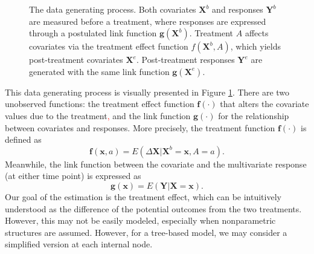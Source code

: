 \documentclass[smallextended]{svjour3}
\newcommand{\bg}[1]{\textcolor{red}{#1}}
\begin{document}
\begin{figure}[!h]
    \centering
    \caption{The data generating process. Both covariates $\bm X^b$ and responses $\bm Y^b$ are measured before a treatment, where responses are expressed through a postulated link function $\bm g(\bm X^b)$. Treatment $A$ affects covariates via the treatment effect function $f(\bm X^b, A)$, which yields post-treatment covariates $\bm X^e$. Post-treatment responses $\bm Y^e$ are generated with the same link function $\bm g(\bm X^e)$.}\label{fig1}
\end{figure}

This data generating process is visually presented in Figure \ref{fig1}. There are two unobserved functions: the treatment effect function $\bm f(\cdot)$ that alters the covariate values due to the treatment\bg{,} and the link function $\bm g(\cdot)$ for the relationship between covariates and responses. More precisely, the treatment function $\bm f(\cdot)$ is defined as 
$$\bm f(\bm x,a) = E(\Delta \bm X | \bm X^b=\bm x,A=a).$$
Meanwhile, the link function between the covariate and the multivariate response (at either time point) is expressed as 
$$\bm g(\bm x) = E(\bm Y |  \bm X = \bm x).$$
Our goal of the estimation is the treatment effect, which can be intuitively understood as the difference of the potential outcomes \citep{rubin1974estimating} from the two treatments. However, this may not be easily modeled, especially when nonparametric structures are assumed. However, for a tree-based model, we may consider a simplified version at each internal node. 
\end{document}
